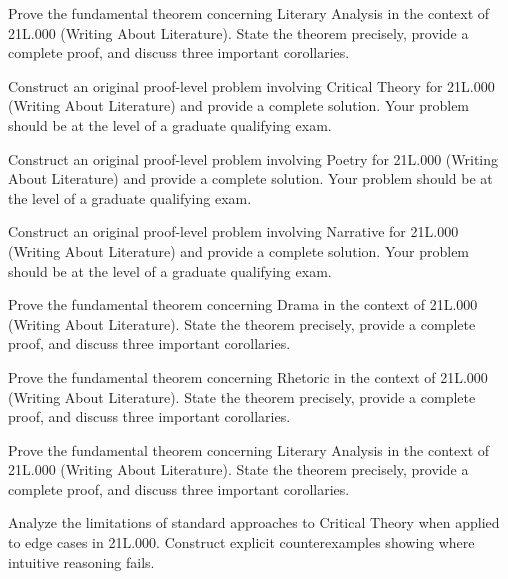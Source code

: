 \documentclass[12pt,a4paper]{exam}
\begin{document}
\begin{questions}

\question[4]
Prove the fundamental theorem concerning Literary Analysis in the context of 21L.000 (Writing About Literature). State the theorem precisely, provide a complete proof, and discuss three important corollaries.

\vspace{0.3cm}

\question[4]
Construct an original proof-level problem involving Critical Theory for 21L.000 (Writing About Literature) and provide a complete solution. Your problem should be at the level of a graduate qualifying exam.

\vspace{0.3cm}

\question[3]
Construct an original proof-level problem involving Poetry for 21L.000 (Writing About Literature) and provide a complete solution. Your problem should be at the level of a graduate qualifying exam.

\vspace{0.3cm}

\question[5]
Construct an original proof-level problem involving Narrative for 21L.000 (Writing About Literature) and provide a complete solution. Your problem should be at the level of a graduate qualifying exam.

\vspace{0.3cm}

\question[4]
Prove the fundamental theorem concerning Drama in the context of 21L.000 (Writing About Literature). State the theorem precisely, provide a complete proof, and discuss three important corollaries.

\vspace{0.3cm}

\question[4]
Prove the fundamental theorem concerning Rhetoric in the context of 21L.000 (Writing About Literature). State the theorem precisely, provide a complete proof, and discuss three important corollaries.

\vspace{0.3cm}

\question[2]
Prove the fundamental theorem concerning Literary Analysis in the context of 21L.000 (Writing About Literature). State the theorem precisely, provide a complete proof, and discuss three important corollaries.

\vspace{0.3cm}

\question[3]
Analyze the limitations of standard approaches to Critical Theory when applied to edge cases in 21L.000. Construct explicit counterexamples showing where intuitive reasoning fails.


\end{questions}
\end{document}
